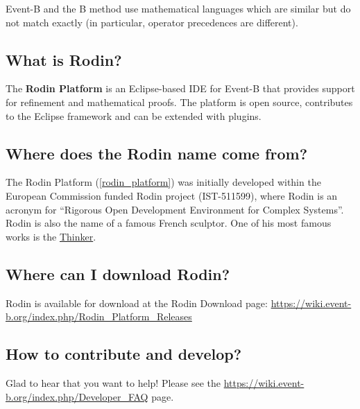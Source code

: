 Event-B and the B method use mathematical languages which are similar but do not match exactly (in particular, operator precedences are different).

\subsection{What is Rodin?}

The \textbf{Rodin Platform} is an Eclipse-based IDE for Event-B that provides support for refinement and mathematical proofs. The platform is open source, contributes to the Eclipse framework and can be extended with plugins.

\subsection{Where does the Rodin name come from?}

The Rodin Platform (\ref{rodin_platform}) was initially developed within the European Commission funded Rodin project (IST-511599), where Rodin is an acronym for ``Rigorous Open Development Environment for Complex Systems''. Rodin is also the name of a famous French sculptor. One of his most famous works is the \href{https://en.wikipedia.org/wiki/The_Thinker}{Thinker}. 

\subsection{Where can I download Rodin?}
\label{faq_where_download_rodin}

Rodin is available for download at the Rodin Download page: \url{https://wiki.event-b.org/index.php/Rodin_Platform_Releases}

\subsection{How to contribute and develop?}

Glad to hear that you want to help!  Please see the \url{https://wiki.event-b.org/index.php/Developer_FAQ} page.

